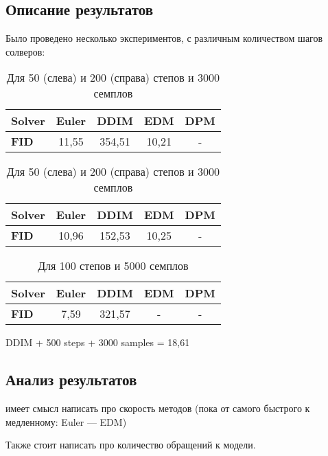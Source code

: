 \documentclass[a4paper]{article}
\begin{document}
    \subsection{Описание результатов}
    Было проведено несколько экспериментов, с различным количеством шагов солверов:
    \begin{table}
        \centering
        \begin{tabular}{ l | c | c | c | c }
            \textbf{Solver} & Euler & DDIM  & EDM   & DPM \\ \hline
            \textbf{FID}    & 11{,}55 & 354{,}51     & 10{,}21   & -
        \end{tabular}\hspace{50pt}%
        \begin{tabular}{ l | c | c | c | c }
            \textbf{Solver} & Euler & DDIM  & EDM   & DPM \\ \hline
            \textbf{FID}    & 10{,}96 & 152{,}53 & 10{,}25 & -
        \end{tabular}
        \caption{Для 50 (слева) и 200 (справа) степов и 3000 семплов}
    \end{table}
    \begin{table}
        \centering
        \begin{tabular}{ l | c | c | c | c }
            \textbf{Solver} & Euler & DDIM  & EDM   & DPM \\ \hline
            \textbf{FID}    & 7{,}59 & 321{,}57 & -   & -
        \end{tabular}
        \caption{Для 100 степов и 5000 семплов}
    \end{table}
    DDIM + 500 steps + 3000 samples = 18{,}61

    \subsection{Анализ результатов}
    
    имеет смысл написать про скорость методов (пока от самого быстрого к медленному:
    Euler --- EDM)

    Также стоит написать про количество обращений к модели.
\end{document}
